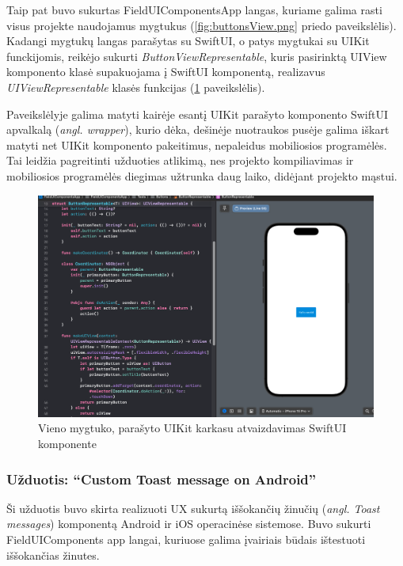 Taip pat buvo sukurtas FieldUIComponentsApp langas, kuriame galima rasti visus projekte naudojamus mygtukus (\ref{fig:buttonsView.png} priedo paveikslėlis). Kadangi mygtukų langas parašytas su SwiftUI, o patys mygtukai su UIKit funckijomis, reikėjo sukurti \textit{ButtonViewRepresentable}, kuris pasirinktą UIView komponento klasė supakuojama į SwiftUI komponentą, realizavus \textit{UIViewRepresentable} klasės funkcijas (\ref{fig:buttonViewRepresentable} paveikslėlis).

Paveikslėlyje galima matyti kairėje esantį UIKit parašyto komponento SwiftUI apvalkalą (\emph{angl. wrapper}), kurio dėka, dešinėje nuotraukos pusėje galima iškart matyti net UIKit komponento pakeitimus, nepaleidus mobiliosios programėlės. Tai leidžia pagreitinti užduoties atlikimą, nes projekto kompiliavimas ir mobiliosios programėlės diegimas užtrunka daug laiko, didėjant projekto mąstui.

\begin{figure} [htbp!]
    \centering
    \includegraphics[width=1\textwidth]{Images/iOSButtonRepresentable.png}
    \caption{Vieno mygtuko, parašyto UIKit karkasu atvaizdavimas SwiftUI komponente}
    \label{fig:buttonViewRepresentable}
\end{figure}

\newpage
\subsubsection{Užduotis: \enquote{Custom Toast message on Android}}
Ši užduotis buvo skirta realizuoti UX sukurtą iššokančių žinučių (\emph{angl. Toast messages}) komponentą Android ir iOS operacinėse sistemose. 
Buvo sukurti FieldUIComponents app langai, kuriuose galima įvairiais būdais ištestuoti iššokančias žinutes.

